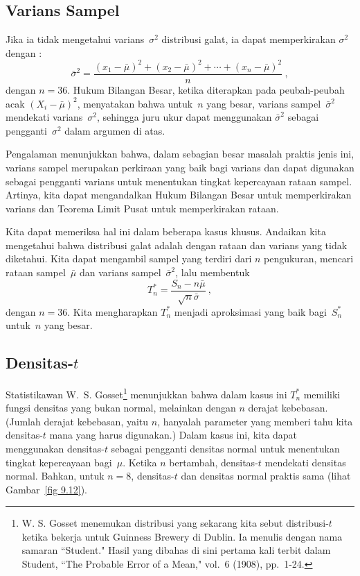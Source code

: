\subsection*{Varians Sampel}
Jika ia tidak mengetahui varians~$\sigma^2$ distribusi galat, ia dapat memperkirakan $\sigma^2$
dengan :
$$
\bar \sigma^2 = \frac {(x_1 - \bar \mu)^2 + (x_2 - \bar \mu)^2
+\cdots+ (x_n - \bar \mu)^2}n\ ,
$$
dengan $n = 36$.  Hukum Bilangan Besar, ketika diterapkan pada peubah-peubah acak
$(X_i - \bar \mu)^2$, menyatakan bahwa untuk~$n$ yang besar, varians sampel~$\bar \sigma^2$
mendekati varians~$\sigma^2$, sehingga juru ukur dapat menggunakan $\bar \sigma^2$ sebagai
pengganti~$\sigma^2$ dalam argumen di atas.
\par
Pengalaman menunjukkan bahwa, dalam sebagian besar masalah praktis jenis ini, varians sampel
merupakan perkiraan yang baik bagi varians dan dapat digunakan sebagai pengganti varians untuk
menentukan tingkat kepercayaan rataan sampel.  Artinya, kita dapat mengandalkan Hukum Bilangan Besar
untuk memperkirakan varians dan Teorema Limit Pusat untuk memperkirakan rataan.
\par
Kita dapat memeriksa hal ini dalam beberapa kasus khusus.  Andaikan kita mengetahui bahwa distribusi
galat adalah  dengan rataan dan varians yang tidak diketahui.  Kita dapat mengambil
sampel yang terdiri dari $n$ pengukuran, mencari rataan sampel~$\bar \mu$ dan varians
sampel~$\bar \sigma^2$, lalu membentuk
$$
T_n^* = \frac {S_n - n\bar\mu}{\sqrt{n}\bar\sigma}\ ,
$$
dengan $n = 36$.  Kita mengharapkan $T_n^*$ menjadi aproksimasi yang baik bagi~$S_n^*$ untuk~$n$
yang besar.

\subsection*{Densitas-$t$}
Statistikawan W.~S. Gosset\footnote{W. S. Gosset menemukan distribusi yang
sekarang kita sebut distribusi-$t$ ketika bekerja untuk Guinness Brewery di Dublin.  Ia menulis
dengan nama samaran ``Student."  Hasil yang dibahas di sini pertama kali terbit dalam Student,
``The Probable Error of a Mean,"  vol.~6 (1908), pp.~1-24.} menunjukkan bahwa
dalam kasus ini $T_n^*$ memiliki fungsi densitas yang bukan normal, melainkan
 dengan $n$ derajat kebebasan.
(Jumlah derajat kebebasan, yaitu $n$, hanyalah parameter yang memberi tahu kita densitas-$t$ mana yang
harus digunakan.)  Dalam kasus ini, kita dapat menggunakan densitas-$t$ sebagai pengganti densitas
normal untuk menentukan tingkat kepercayaan bagi~$\mu$.  Ketika $n$ bertambah, densitas-$t$
mendekati densitas normal.  Bahkan, untuk $n = 8$, densitas-$t$ dan densitas normal praktis sama
(lihat Gambar~\ref{fig 9.12}).

